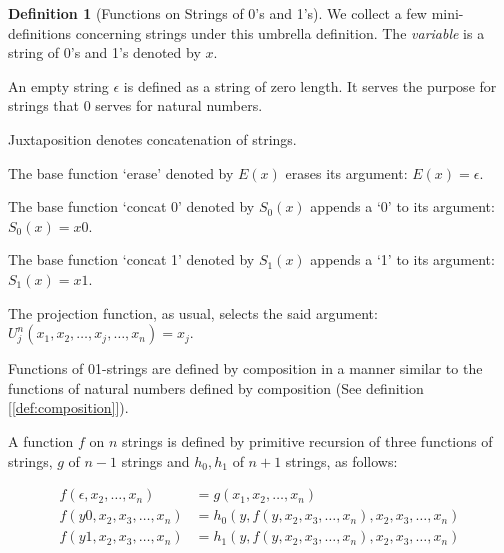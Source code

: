 \documentclass[11pt]{book}
\theoremstyle{definition}
\newtheorem{definition}{Definition}
\theoremstyle{plain}
\theoremstyle{problemstyle}
\theoremstyle{remark}
\theoremstyle{definition}
\begin{document}
\begin{definition}[Functions on Strings of 0's and 1's]
    \label{def:functions-on-strings}
    We collect a few mini-definitions concerning strings under this umbrella definition. The \emph{variable} is a string of 0's and 1's denoted by $x$.

    An empty string $\epsilon$ is defined as a string of zero length. It serves the purpose for strings that 0 serves for natural numbers.

    Juxtaposition denotes concatenation of strings.

    The base function `erase' denoted by $E(x)$ erases its argument: $E(x)=\epsilon$.

    The base function `concat 0' denoted by $S_0(x)$ appends a `0' to its argument: $S_0(x)=x0$.

    The base function `concat 1' denoted by $S_1(x)$ appends a `1' to its argument: $S_1(x)=x1$.

    The projection function, as usual, selects the said argument: $U^n_j(x_1,x_2,\dots,x_j,\dots,x_n)=x_j$.

    Functions of 01-strings are defined by composition in a manner similar to the functions of natural numbers defined by composition (See definition [\ref{def:composition}]).

    A function $f$ on $n$ strings is defined by primitive recursion of three functions of strings, $g$ of $n-1$ strings and $h_0,h_1$ of $n+1$ strings, as follows:

    \begin{equation}
        \label{eq:primitive-recursive-functions-of-strings}
        \begin{aligned}
            f(\epsilon,x_2,\dots,x_n)&=g(x_1,x_2,\dots,x_n)\\
            f(y0,x_2,x_3,\dots,x_n)&=h_0(y,f(y,x_2,x_3,\dots,x_n),x_2,x_3,\dots,x_n)\\
            f(y1,x_2,x_3,\dots,x_n)&=h_1(y,f(y,x_2,x_3,\dots,x_n),x_2,x_3,\dots,x_n)\\
        \end{aligned}
    \end{equation}
\end{definition}
\end{document}
